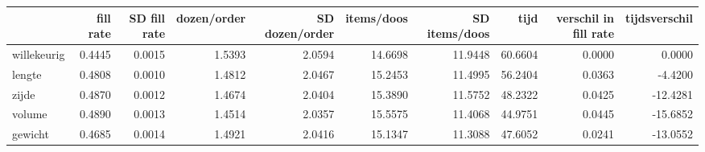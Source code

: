 \begin{tabular}{lrrrrrrrrr}
\toprule
{} &  fill rate &  SD fill rate &  dozen/order &  SD dozen/order &  items/doos &  SD items/doos &     tijd &  verschil in fill rate &  tijdsverschil \\
\midrule
willekeurig &     0.4445 &        0.0015 &       1.5393 &          2.0594 &     14.6698 &        11.9448 &  60.6604 &                 0.0000 &         0.0000 \\
lengte      &     0.4808 &        0.0010 &       1.4812 &          2.0467 &     15.2453 &        11.4995 &  56.2404 &                 0.0363 &        -4.4200 \\
zijde       &     0.4870 &        0.0012 &       1.4674 &          2.0404 &     15.3890 &        11.5752 &  48.2322 &                 0.0425 &       -12.4281 \\
volume      &     0.4890 &        0.0013 &       1.4514 &          2.0357 &     15.5575 &        11.4068 &  44.9751 &                 0.0445 &       -15.6852 \\
gewicht     &     0.4685 &        0.0014 &       1.4921 &          2.0416 &     15.1347 &        11.3088 &  47.6052 &                 0.0241 &       -13.0552 \\
\bottomrule
\end{tabular}
